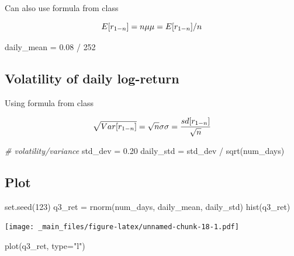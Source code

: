 \documentclass[
  oneside]{book}
\newenvironment{Shaded}{\begin{snugshade}}{\end{snugshade}}
\newcommand{\AttributeTok}[1]{\textcolor[rgb]{0.77,0.63,0.00}{#1}}
\newcommand{\CommentTok}[1]{\textcolor[rgb]{0.56,0.35,0.01}{\textit{#1}}}
\newcommand{\DecValTok}[1]{\textcolor[rgb]{0.00,0.00,0.81}{#1}}
\newcommand{\FloatTok}[1]{\textcolor[rgb]{0.00,0.00,0.81}{#1}}
\newcommand{\FunctionTok}[1]{\textcolor[rgb]{0.00,0.00,0.00}{#1}}
\newcommand{\NormalTok}[1]{#1}
\newcommand{\OtherTok}[1]{\textcolor[rgb]{0.56,0.35,0.01}{#1}}
\newcommand{\SpecialCharTok}[1]{\textcolor[rgb]{0.00,0.00,0.00}{#1}}
\newcommand{\StringTok}[1]{\textcolor[rgb]{0.31,0.60,0.02}{#1}}
\begin{document}
Can also use formula from class

\[
E[r_{1-n}] = n\mu \\
\mu = E[r_{1-n}] / n
\]

\begin{Shaded}
\begin{Highlighting}[]
\NormalTok{daily\_mean }\OtherTok{=} \FloatTok{0.08} \SpecialCharTok{/} \DecValTok{252}
\end{Highlighting}
\end{Shaded}

\hypertarget{volatility-of-daily-log-return}{%
\subsection{Volatility of daily log-return}\label{volatility-of-daily-log-return}}

Using formula from class

\[
\sqrt{Var[r_{1-n}]} = \sqrt{n}\sigma\\
\sigma = \frac{sd[r_{1-n}]}{\sqrt{n}}
\]

\begin{Shaded}
\begin{Highlighting}[]
\CommentTok{\# volatility/variance}
\NormalTok{std\_dev }\OtherTok{=} \FloatTok{0.20}
\NormalTok{daily\_std }\OtherTok{=}\NormalTok{ std\_dev }\SpecialCharTok{/} \FunctionTok{sqrt}\NormalTok{(num\_days)}
\end{Highlighting}
\end{Shaded}

\hypertarget{plot-1}{%
\subsection{Plot}\label{plot-1}}

\begin{Shaded}
\begin{Highlighting}[]
\FunctionTok{set.seed}\NormalTok{(}\DecValTok{123}\NormalTok{)}
\NormalTok{q3\_ret }\OtherTok{=} \FunctionTok{rnorm}\NormalTok{(num\_days, daily\_mean, daily\_std)}
\FunctionTok{hist}\NormalTok{(q3\_ret)}
\end{Highlighting}
\end{Shaded}

\texttt{[image: \_main\_files/figure-latex/unnamed-chunk-18-1.pdf]}

\begin{Shaded}
\begin{Highlighting}[]
\FunctionTok{plot}\NormalTok{(q3\_ret, }\AttributeTok{type=}\StringTok{"l"}\NormalTok{)}
\end{Highlighting}
\end{Shaded}
\end{document}
